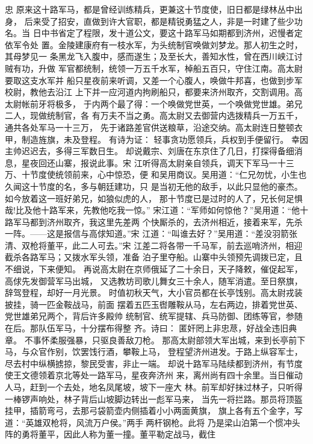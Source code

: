 忠
原来这十路军马，都是曾经训练精兵，更兼这十节度使，旧日都是绿林丛中出身，
后来受了招安，直做到许大官职，都是精锐勇猛之人，非是一时建了些少功名。当
日中书省定了程限，发十道公文，要这十路军马如期都到济州，迟慢者定依军令处
置。金陵建康府有一枝水军，为头统制官唤做刘梦龙。那人初生之时，其母梦见一
条黑龙飞入腹中，感而遂生；及至长大，善知水性，曾在西川峡江讨贼有功，升做
军官都统制，统领一万五千水军，棹船五百只，守住江南。高太尉要取这支水军并
船只星夜前来听调，又差一个心腹人，唤做牛邦喜，也做到步军校尉，教他去沿江
上下并一应河道内拘刷船只，都要来济州取齐，交割调用。高太尉帐前牙将极多，
于内两个最了得：一个唤做党世英，一个唤做党世雄。弟兄二人，现做统制官，各
有万夫不当之勇。高太尉又去御营内选拨精兵一万五千，通共各处军马一十三万，
先于诸路差官供送粮草，沿途交纳。高太尉连日整顿衣甲，制造旌旗，未及登程。
有诗为证：
轻事贪功愿领兵，兵权到手便留行。
幸因主帅迟迟去，多得三军数日生。
却说戴宗、刘唐在东京住了几日，打探得备细消息，星夜回还山寨，报说此事。宋
江听得高太尉亲自领兵，调天下军马一十三万、十节度使统领前来，心中惊恐，便
和吴用商议。吴用道：“仁兄勿忧，小生也久闻这十节度的名，多与朝廷建功，只
是当初无他的敌手，以此只显他的豪杰。如今放着这一班好弟兄，如狼似虎的人，
那十节度已是过时的人了，兄长何足惧哉!比及他十路军来，先教他吃我一惊。”
宋江道：“军师如何惊他？”吴用道：“他十路军马都到济州取齐，我这里先差两
个快厮杀的，去济州相近，接着来军，先杀一阵。——这是报信与高俅知道。”宋
江道：“叫谁去好？”吴用道：“差没羽箭张清、双枪将董平，此二人可去。”宋
江差二将各带一千马军，前去巡哨济州，相迎截杀各路军马；又拨水军头领，准备
泊子里夺船。山寨中头领预先调拨已定，且不细说，下来便知。
再说高太尉在京师俄延了二十余日，天子降敕，催促起军，高俅先发御营军马出城，
又选教坊司歌儿舞女三十余人，随军消遣。至日祭旗，辞驾登程，却好一月光景。
时值初秋天气，大小官员都在长亭饯别。高太尉戎装披挂，骑一匹金鞍战马，前面
摆着五匹玉辔雕鞍从马，左右两边，排着党世英、党世雄弟兄两个，背后许多殿帅
统制官、统军提辖、兵马防御、团练等官，参随在后。那队伍军马，十分摆布得整
齐。诗曰：
匿奸罔上非忠荩，好战全违旧典章。
不事怀柔服强暴，只驱良善敌刀枪。
那高太尉部领大军出城，来到长亭前下马，与众官作别，饮罢饯行酒，攀鞍上马，
登程望济州进发。于路上纵容军士，尽去村中纵横掳掠，黎民受害，非止一端。
却说十路军马陆续都到济州，有节度使王文德领着京北等处一路军马，星夜奔济州
来，离州尚有四十余里。当日催动人马，赶到一个去处，地名凤尾坡，坡下一座大
林。前军却好抹过林子，只听得一棒锣声响处，林子背后山坡脚边转出一彪军马来，
当先一将拦路。那员将顶盔挂甲，插箭弯弓，去那弓袋箭壶内侧插着小小两面黄旗，
旗上各有五个金字，写道：“英雄双枪将，风流万户侯。”两手两杆钢枪。此将
乃是梁山泊第一个惯冲头阵的勇将董平，因此人称为董一撞。董平勒定战马，截住
